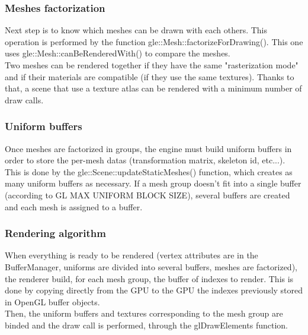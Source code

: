 \documentclass [a4 paper,11pt]{report}
\begin{document}
\subsubsection{Meshes factorization}
Next step is to know which meshes can be drawn with each others. This operation is performed by the function gle::Mesh::factorizeForDrawing(). This one uses gle::Mesh::canBeRenderedWith() to compare the meshes.\\
Two meshes can be rendered together if they have the same "rasterization mode" and if their materials are compatible (if they use the same textures). Thanks to that, a scene that use a texture atlas can be rendered with a minimum number of draw calls.

\subsubsection{Uniform buffers}
Once meshes are factorized in groups, the engine must build uniform buffers in order to store the per-mesh datas (transformation matrix, skeleton id, etc...). This is done by the gle::Scene::updateStaticMeshes() function, which creates as many uniform buffers as necessary. If a mesh group doesn't fit into a single buffer (according to GL MAX UNIFORM BLOCK SIZE), several buffers are created and each mesh is assigned to a buffer.

\subsubsection{Rendering algorithm}
When everything is ready to be rendered (vertex attributes are in the BufferManager, uniforms are divided into several buffers, meshes are factorized), the renderer build, for each mesh group, the buffer of indexes to render. This is done by copying directly from the GPU to the GPU the indexes previously stored in OpenGL buffer objects.\\
Then, the uniform buffers and textures corresponding to the mesh group are binded and the draw call is performed, through the glDrawElements function.
\end{document}
